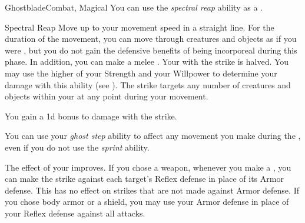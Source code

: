 \begin{feat}{Ghostblade}{Combat, Magical}
         You can use the \textit{spectral reap} ability as a .
        \begin{durationability}{Spectral Reap}
            \rankline
            Move up to your movement speed in a straight line.
            For the duration of the movement, you can move through creatures and objects as if you were , but you do not gain the defensive benefits of being incorporeal during this phase.
            In addition, you can make a melee .
            Your  with the strike is halved.
            You may use the higher of your Strength and your Willpower to determine your damage with this ability (see ).
            The strike targets any number of creatures and objects within your  at any point during your movement.

            \rankline
             You gain a \plus1d bonus to damage with the strike.
        \end{durationability}

         You can use your \textit{ghost step} ability to affect any movement you make during the , even if you do not use the \textit{sprint} ability.

         The effect of your  improves.
        If you chose a weapon, whenever you make a , you can make the strike against each target's Reflex defense in place of its Armor defense.
        This has no effect on strikes that are not made against Armor defense.
        If you chose body armor or a shield, you may use your Armor defense in place of your Reflex defense against all attacks.
    \end{feat}

